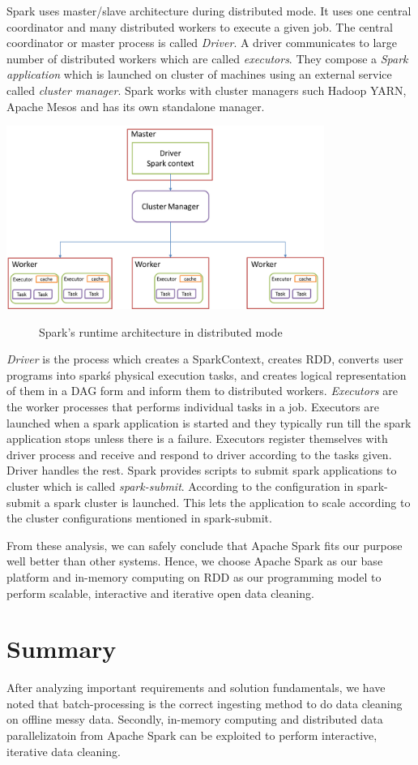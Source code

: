 Spark uses master/slave architecture during distributed mode. It uses one central coordinator and many distributed workers to execute a given job. The central coordinator or master process is called \textit{Driver}. A driver communicates to large number of distributed workers which are called \textit{executors}. They compose a \textit{Spark application} which is launched on cluster of machines using an external service called \textit{cluster manager}. Spark works with cluster managers such Hadoop YARN, Apache Mesos and has its own standalone manager. 
\begin{center}
	\includegraphics[width=28em]{./Figures/spark-master-slave}
	\begin{figure}[htbp]
    \caption{Spark's runtime architecture in distributed mode}
    \label{fig:spark-masterslave}
	\end{figure}
\end{center}
\textit{Driver} is the process which creates a SparkContext, creates RDD, converts user programs into spark\'s physical execution tasks, and creates logical representation of them in a DAG form and inform them to distributed workers. \textit{Executors} are the worker processes that performs individual tasks in a job. Executors are launched when a spark application is started and they typically run till the spark application stops unless there is a failure. Executors register themselves with driver process and receive and respond to driver according to the tasks given. Driver handles the rest.  Spark provides scripts to submit spark applications to cluster which is called \textit{spark-submit}. According to the configuration in spark-submit a spark cluster is launched. This lets the application to scale according to the cluster configurations mentioned in spark-submit. 

From these analysis, we can safely conclude that Apache Spark fits our purpose well better than other systems. Hence, we choose Apache Spark as our base platform and in-memory computing on RDD as our programming model to perform scalable, interactive and iterative open data cleaning.
\section{Summary}
After analyzing important requirements and solution fundamentals, we have noted that batch-processing is the correct ingesting method to do data cleaning on offline messy data. Secondly, in-memory computing and distributed data parallelizatoin from Apache Spark can be exploited to perform interactive, iterative data cleaning. 